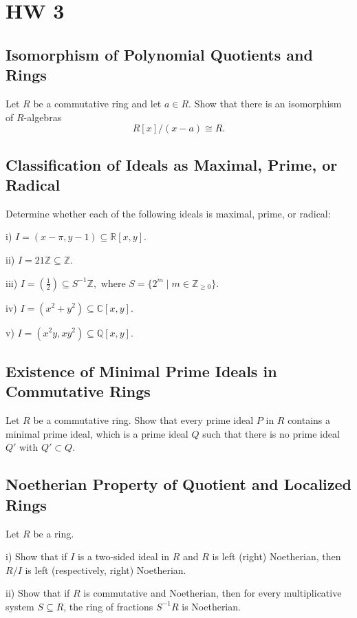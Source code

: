 \documentclass[lang=cn,11pt]{template}
\begin{document}
\chapter{HW 3}

\section{Isomorphism of Polynomial Quotients and Rings}
Let \( R \) be a commutative ring and let \( a \in R \). Show that there is an isomorphism of \( R \)-algebras
\[
R[x]/(x - a) \cong R.
\]

\section{Classification of Ideals as Maximal, Prime, or Radical}
Determine whether each of the following ideals is maximal, prime, or radical:

i) \( I = (x - \pi, y - 1) \subseteq \mathbb{R}[x, y] \).

ii) \( I = 21\mathbb{Z} \subseteq \mathbb{Z} \).

iii) \( I = \left( \frac{1}{2} \right) \subseteq S^{-1}\mathbb{Z}, \) where \( S = \{2^m \mid m \in \mathbb{Z}_{\geq 0} \} \).

iv) \( I = (x^2 + y^2) \subseteq \mathbb{C}[x, y] \).

v) \( I = (x^2 y, x y^2) \subseteq \mathbb{Q}[x, y] \).

\section{Existence of Minimal Prime Ideals in Commutative Rings}
Let \( R \) be a commutative ring. Show that every prime ideal \( P \) in \( R \) contains a minimal prime ideal, which is a prime ideal \( Q \) such that there is no prime ideal \( Q' \) with \( Q' \subset Q \).

\section{Noetherian Property of Quotient and Localized Rings}
Let \( R \) be a ring.

i) Show that if \( I \) is a two-sided ideal in \( R \) and \( R \) is left (right) Noetherian, then \( R/I \) is left (respectively, right) Noetherian.

ii) Show that if \( R \) is commutative and Noetherian, then for every multiplicative system \( S \subseteq R \), the ring of fractions \( S^{-1}R \) is Noetherian.
\end{document}
